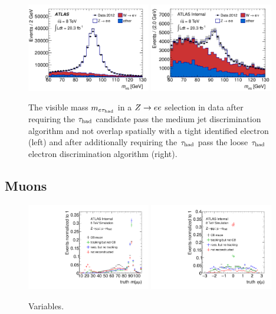 \begin{figure}[tp]
  \centering
  \includegraphics[width=0.48\textwidth]{figures/PERF-2013-06/fig_14a}
  \includegraphics[width=0.48\textwidth]{figures/PERF-2013-06/eveto_mvis_mediumID_loosePPOLR_looseeveto}
  \caption{The visible mass $m_{e\tau_\text{had}}$ in a $Z \rightarrow ee$ selection in data after requiring the $\tau_\text{had}$ candidate pass the medium jet discrimination algorithm and not overlap spatially with a tight identified electron (left) and after additionally requiring the $\tau_\text{had}$ pass the loose $\tau_\text{had}$ electron discrimination algorithm (right).}
  \label{fig:taus-electronfakes2}
\end{figure}

\subsection{Muons}

\begin{figure}[tp]
  \centering
  \includegraphics[width=0.48\textwidth]{figures/tauperformance/muonfakes_mll}
  \includegraphics[width=0.48\textwidth]{figures/tauperformance/muonfakes_eta}
  \caption{Variables.}
  \label{fig:taus-muonfakes1}
\end{figure}

